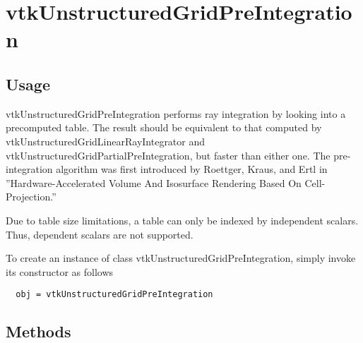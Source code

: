 \section{vtkUnstructuredGridPreIntegration}

\subsection{Usage}


 vtkUnstructuredGridPreIntegration performs ray integration by looking
 into a precomputed table.  The result should be equivalent to that
 computed by vtkUnstructuredGridLinearRayIntegrator and
 vtkUnstructuredGridPartialPreIntegration, but faster than either one.
 The pre-integration algorithm was first introduced by Roettger, Kraus,
 and Ertl in ''Hardware-Accelerated Volume And Isosurface Rendering Based
 On Cell-Projection.''

 Due to table size limitations, a table can only be indexed by
 independent scalars.  Thus, dependent scalars are not supported.


To create an instance of class vtkUnstructuredGridPreIntegration, simply
invoke its constructor as follows
\begin{verbatim}
  obj = vtkUnstructuredGridPreIntegration
\end{verbatim}
\subsection{Methods}


